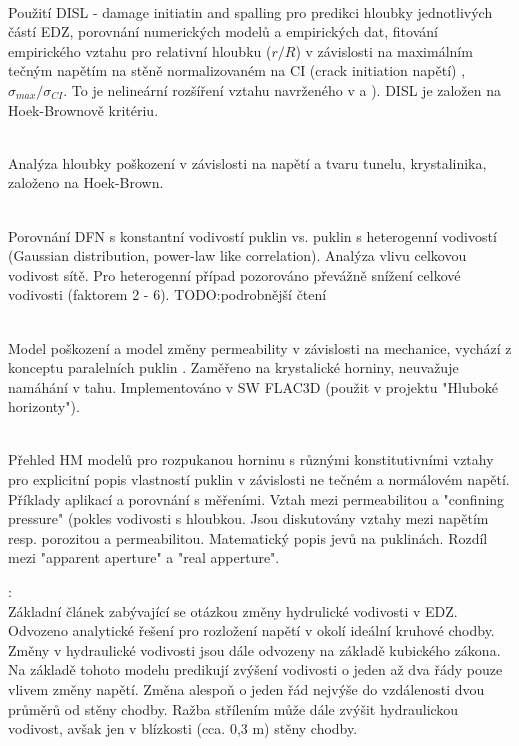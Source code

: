 \documentclass{article}
\def\todo#1{{TODO:\color{red}#1}}
\begin{document}
\\
Použití DISL - damage initiatin and spalling pro predikci hloubky jednotlivých částí EDZ,
porovnání numerických modelů a empirických dat, fitování empirického vztahu pro relativní hloubku 
($r/R$) v závislosti na maximálním tečným napětím na stěně normalizovaném na CI (crack initiation napětí)
,$\sigma_{max} / \sigma_{CI}$. To je nelineární rozšíření vztahu navrženého v
\cite{Martin1999} a \cite{Diederichs2007}). 
DISL je založen na Hoek-Brownově kritériu.

\\
Analýza hloubky poškození v závislosti na napětí a tvaru tunelu, krystalinika, založeno na Hoek-Brown.

\\
Porovnání DFN s konstantní vodivostí puklin vs. puklin s heterogenní vodivostí (Gaussian distribution, power-law like correlation). Analýza vlivu celkovou vodivost sítě. Pro heterogenní případ pozorováno převážně snížení celkové vodivosti (faktorem 2 - 6). \todo{podrobnější čtení}



\\
Model poškození a model změny permeability v závislosti na mechanice, vychází z konceptu paralelních puklin \cite{Snow1965}. Zaměřeno na krystalické horniny, neuvažuje namáhání v tahu.  Implementováno v SW FLAC3D (použit v projektu "Hluboké horizonty").

\\
Přehled HM modelů pro rozpukanou horninu s různými konstitutivními 
vztahy pro explicitní popis vlastností puklin v závislosti ne tečném a normálovém napětí. 
Příklady aplikací a porovnání s měřeními.
Vztah mezi permeabilitou a "confining pressure" 
(pokles vodivosti s hloubkou. Jsou diskutovány vztahy mezi napětím resp. 
porozitou a permeabilitou. Matematický popis jevů na puklinách. Rozdíl mezi "apparent aperture" 
a "real apperture". 



{\bf \cite{Kelsall1984}}:\\
Základní článek zabývající se otázkou změny hydrulické vodivosti v EDZ. 
Odvozeno analytické řešení pro rozložení napětí v okolí ideální kruhové chodby. 
Změny v hydraulické vodivosti jsou dále odvozeny na základě kubického zákona. 
Na základě tohoto modelu predikují zvýšení vodivosti o jeden až dva řády pouze vlivem změny napětí. Změna alespoň o jeden řád nejvýše do vzdálenosti dvou průměrů od stěny chodby. Ražba střílením může dále zvýšit hydraulickou vodivost, avšak jen v blízkosti (cca. 0,3 m) stěny chodby.
\end{document}
